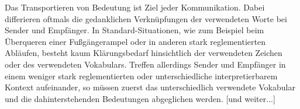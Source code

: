 
Das Transportieren von Bedeutung ist Ziel jeder Kommunikation. Dabei
differieren oftmals die gedanklichen Verknüpfungen der verwendeten Worte bei
Sender und Empfänger. In Standard-Situationen, wie zum Beispiel beim
Überqueren einer Fußgängerampel oder in anderen stark reglementierten
Abläufen, besteht kaum Klärungsbedarf hinsichtlich der verwendeten Zeichen
oder des verwendeten Vokabulars. Treffen allerdings Sender und Empfänger in
einem weniger stark reglementierten oder unterschiedliche interpretierbarem
Kontext aufeinander, so müssen zuerst das unterschiedlich verwendete Vokabular
und die dahinterstehenden Bedeutungen abgeglichen werden. [und weiter...] \cite{sgthesis}
